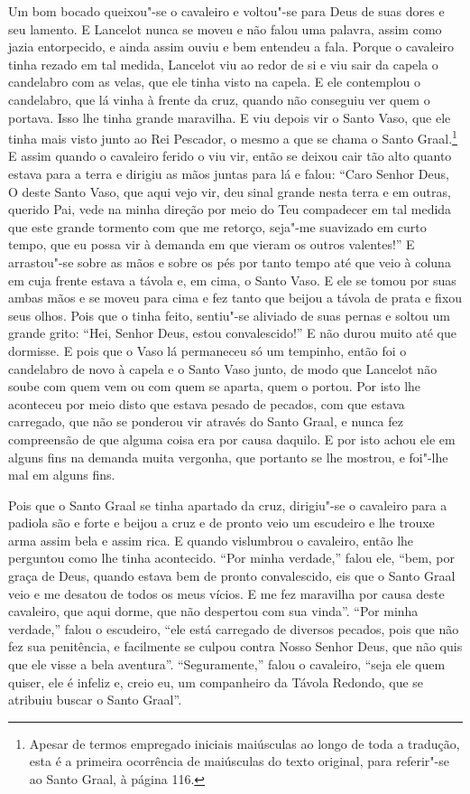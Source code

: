 Um bom bocado queixou"-se o cavaleiro e voltou"-se para Deus de suas dores e seu
lamento. E Lancelot nunca se moveu e não falou uma palavra, assim como jazia
entorpecido, e ainda assim ouviu e bem entendeu a fala. Porque o cavaleiro
tinha rezado em tal medida, Lancelot viu ao redor de si e viu sair da capela o
candelabro com as velas, que ele tinha visto na capela. E ele contemplou o
candelabro, que lá vinha à frente da cruz, quando não conseguiu ver quem o
portava. Isso lhe tinha grande maravilha. E viu depois vir o Santo Vaso, que
ele tinha mais visto junto ao Rei Pescador, o mesmo a que se chama o Santo
Graal.\footnote{ Apesar de termos empregado iniciais maiúsculas ao longo de toda
a tradução, esta é a primeira ocorrência de maiúsculas do texto original, para
referir"-se ao Santo Graal, à página 116.} E assim quando o
cavaleiro ferido o viu vir, então se deixou cair tão alto quanto estava para a
terra e dirigiu as mãos juntas para lá e falou: “Caro Senhor Deus, O deste
Santo Vaso, que aqui vejo vir, deu sinal grande nesta terra e em outras,
querido Pai, vede na minha direção por meio do Teu compadecer em tal medida que
este grande tormento com que me retorço, seja"-me suavizado em curto tempo, que
eu possa vir à demanda em que vieram os outros valentes!” E arrastou"-se sobre
as mãos e sobre os pés por tanto tempo até que veio à coluna em cuja frente
estava a távola e, em cima, o Santo Vaso. E ele se tomou por suas ambas mãos e
se moveu para cima e fez tanto que beijou a távola de prata e fixou seus olhos.
Pois que o tinha feito, sentiu"-se aliviado de suas pernas e soltou um grande
grito: “Hei, Senhor Deus, estou convalescido!” E não durou muito até que
dormisse. E pois que o Vaso lá permaneceu só um tempinho, então foi o
candelabro de novo à capela e o Santo Vaso junto, de modo que Lancelot não
soube com quem vem ou com quem se aparta, quem o portou. Por isto lhe aconteceu
por meio disto que estava pesado de pecados, com que estava carregado, que não
se ponderou vir através do Santo Graal, e nunca fez compreensão de que alguma
coisa era por causa daquilo. E por isto achou ele em alguns fins na demanda
muita vergonha, que portanto se lhe mostrou, e foi"-lhe mal em alguns fins. 

Pois que o Santo Graal se tinha apartado da cruz, dirigiu"-se o cavaleiro para a
padiola são e forte e beijou a cruz e de pronto veio um escudeiro e lhe trouxe
arma assim bela e assim rica. E quando vislumbrou o cavaleiro, então lhe
perguntou como lhe tinha acontecido. “Por minha verdade,” falou ele, “bem, por
graça de Deus, quando estava bem de pronto convalescido, eis que o Santo Graal
veio e me desatou de todos os meus vícios. E me fez maravilha por causa deste
cavaleiro, que aqui dorme, que não despertou com sua vinda”. “Por minha
verdade,” falou o escudeiro, “ele está carregado de diversos pecados, pois que
não fez sua penitência, e facilmente se culpou contra Nosso Senhor Deus, que
não quis que ele visse a bela aventura”. “Seguramente,” falou o cavaleiro,
“seja ele quem quiser, ele é infeliz e, creio eu, um companheiro da Távola
Redondo, que se atribuiu buscar o Santo Graal”.

